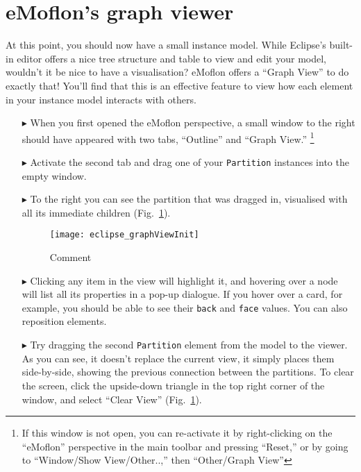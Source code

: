 \newpage
\section{eMoflon's graph viewer}
\genHeader
\hypertarget{sec:Graph View}{}

At this point, you should now have a small instance model. While Eclipse's built-in editor offers a nice tree structure and table to view and edit your model,
wouldn't it be nice to have a visualisation? eMoflon offers a ``Graph View'' to do exactly that! You'll find that this is an effective
feature to view how each element in your instance model interacts with others.

\begin{itemize}

\item[$\blacktriangleright$] When you first opened the eMoflon perspective, a small window to the right should have appeared with two tabs, ``Outline'' and
``Graph View.'' \footnote{If this window is not open, you can re-activate it by right-clicking on the ``eMoflon'' perspective in the main toolbar and pressing
``Reset,'' or by going to ``Window/Show View/Other..,'' then ``Other/Graph View''} 

\item[$\blacktriangleright$] Activate the second tab and drag one of your \texttt{Partition} instances into the empty window. 

\item[$\blacktriangleright$] To the right you can see the partition that was dragged in, visualised with all its immediate children
(Fig.~\ref{fig:graphView_init}).

\begin{figure}[htbp]
	\centering
  \texttt{[image: eclipse\_graphViewInit]}
	\caption{Comment}
	\label{fig:graphView_init}
\end{figure}

\item[$\blacktriangleright$] Clicking any item in the view will highlight it, and hovering over a node will list all its properties in a pop-up dialogue. If you
hover over a card, for example, you should be able to see their \texttt{back} and \texttt{face} values. You can also reposition elements.

\clearpage

\item[$\blacktriangleright$] Try dragging the second \texttt{Partition} element from the model to the viewer. As you can see, it doesn't replace the current
view, it simply places them side-by-side, showing the previous connection between the partitions. To clear the screen, click the upside-down triangle in the top
right corner of the window, and select ``Clear View'' (Fig.~\ref{fig:graphView_init}).


\end{itemize}
